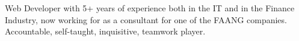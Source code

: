 

\begin{cvparagraph}

Web Developer with 5+ years of experience both in the IT and in the Finance Industry, now working for as a consultant for one of the FAANG companies. Accountable, self-taught, inquisitive, teamwork player.
\end{cvparagraph}
